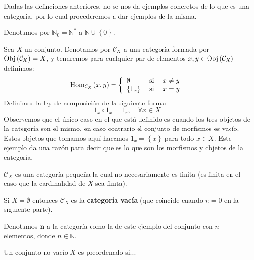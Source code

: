 \documentclass[12pt]{report}
\theoremstyle{largebreak}
\newcommand{\Obj}[1]{\ensuremath{\textup{Obj}\left(#1\right)}}
\newcommand{\Hom}[3]{\ensuremath{\textup{Hom}_{#1}\left(#2,#3\right)}}
\newcommand{\Cat}[1]{\ensuremath{\textup{\textbf{#1}}}}
\begin{document}
    Dadas las definciones anteriores, no se nos da ejemplos concretos de lo que es una categoría, por lo cual procederemos a dar ejemplos de la misma.

    \begin{obs}
        Denotamos por $\mathbb{N}_0=\mathbb{N}^*$ a $\mathbb{N}\cup\left\{0\right\}$.
    \end{obs}

    \begin{exa}
        Sea $X$ un conjunto. Denotamos por $\mathcal{C}_X$ a una categoría formada por $\Obj{\mathcal{C}_X}=X$, y tendremos para cualquier par de elementos $x,y\in\Obj{\mathcal{C}_X}$ definimos:
        \begin{equation*}
            \Hom{\mathcal{C}_X}{x}{y}=\left\{
                \begin{array}{lcr}
                    \emptyset & \textup{ si } & x\neq y\\
                    \left\{1_x\right\} & \textup{ si } & x=y\\
                \end{array}
            \right.
        \end{equation*}
        Definimos la ley de composición de la siguiente forma:
        \begin{equation*}
            1_x\circ 1_x=1_x,\quad\forall x\in X
        \end{equation*}
        Observemos que el único caso en el que está definido es cuando los tres objetos de la categoría son el mismo, en caso contrario el conjunto de morfismos es vacío. Estos objetos que tomamos aquí hacemos $1_x=\left\{x\right\}$ para todo $x\in X$. Este ejemplo da una razón para decir que es lo que son los morfismos y objetos de la categoría.

        $\mathcal{C}_X$ es una categoría pequeña la cual no necesariamente es finita (es finita en el caso que la cardinalidad de $X$ sea finita).

        Si $X=\emptyset$ entonces $\mathcal{C}_X$ es la \textbf{categoría vacía} (que coincide cuando $n=0$ en la siguiente parte).
        
        Denotamos $\Cat{n}$ a la categoría como la de este ejemplo del conjunto con $n$ elementos, donde $n\in\mathbb{N}$.
    \end{exa}
    
    \begin{mydef}
        Un conjunto no vacío $X$ es preordenado si...
    \end{mydef}
\end{document}
